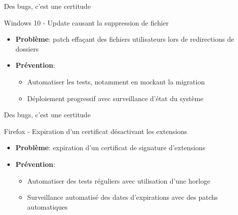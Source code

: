 \documentclass[aspectratio=169,10pt]{beamer}
\begin{document}

\begin{frame}{Des bugs, c'est une certitude}

\begin{alertblock}{Windows 10 - Update causant la suppression de fichier}
    \begin{itemize}
        \item \textbf{Problème}: patch effaçant des fichiers utilisateurs lors de redirections de dossiers
        \item \textbf{Prévention}:
            \begin{itemize}
                \item Automatiser les tests, notamment en mockant la migration
                \item Déploiement progressif avec surveillance d'état du système
            \end{itemize}
    \end{itemize}
\end{alertblock}

\end{frame}


\begin{frame}{Des bugs, c'est une certitude}

\begin{alertblock}{Firefox - Expiration d'un certificat désactivant les extensions}
    \begin{itemize}
        \item \textbf{Problème}: expiration d’un certificat de signature d’extensions
        \item \textbf{Prévention}:
            \begin{itemize}
                \item Automatiser des tests réguliers avec utilisation d'une horloge
                \item Surveillance automatisé des dates d'expirations avec des patchs automatiques
            \end{itemize}
    \end{itemize}
\end{alertblock}

\end{frame}

\end{document}
